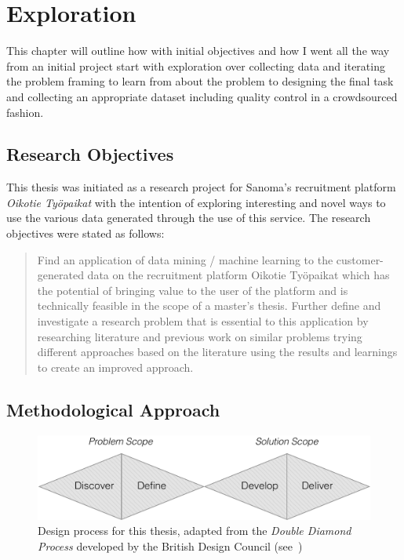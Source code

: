 
\clearpage

\section{Exploration}
\label{sec:Exploration}

This chapter will outline how with initial objectives and how I went all the way from an initial project start with exploration over collecting data and iterating the problem framing to learn from about the problem to designing the final task and collecting an appropriate dataset including quality control in a crowdsourced fashion. 

\subsection{Research Objectives}
\label{sub:Research Objectives}

This thesis was initiated as a research project for Sanoma's recruitment platform \emph{Oikotie Työpaikat} with the intention of exploring interesting and novel ways to use the various data generated through the use of this service. The research objectives were stated as follows:

\blockquote{Find an application of data mining / machine learning to the customer-generated data on the recruitment platform Oikotie Työpaikat which has the potential of bringing value to the user of the platform and is technically feasible in the scope of a master’s thesis. Further define and investigate a research problem that is essential to this application by researching literature and previous work on similar problems trying different approaches based on the literature using the results and learnings to create an improved approach.}



\subsection{Methodological Approach}
\label{sub:Methodological Approach}

\begin{figure}[h]
    \centering
    \includegraphics[width=\textwidth]{img/double-diamond.pdf}
    \caption{Design process for this thesis, adapted from the \emph{Double Diamond Process} developed by the British Design Council (see~\cite{Council:2007aa})}
\label{fig:double-diamond}
\end{figure}

